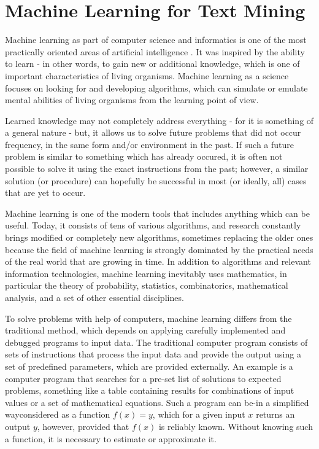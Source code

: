 \documentclass[11pt,openany,executivepaper]{book}
\begin{document}
\section{Machine Learning for Text Mining}
Machine learning \cite{199} as part of computer science and informatics is one of the most practically oriented areas of artificial intelligence \cite{161}. It was inspired by the ability to learn - in other words, to gain new or additional knowledge, which is one of important characteristics of living organisms. Machine learning as a science focuses on looking for and developing algorithms, which can simulate or emulate mental abilities of living organisms from the learning point of view.

Learned knowledge may not completely address everything - for it is something of a general nature - but, it allows us to solve future problems that did not occur frequency, in the same form and/or environment in the past. If such a future problem is similar to something which has already occured, it is often not possible to solve it using the exact instructions from the past; however, a similar solution (or procedure) can hopefully be successful in most (or ideally, all) cases that are yet to occur.

Machine learning is one of the modern tools that includes anything which can be useful. Today, it consists of tens of various algorithms, and research constantly brings modified or completely new algorithms, sometimes replacing the older ones because the field of machine learning is strongly dominated by the practical needs of the real world that are growing in time. In addition to algorithms and relevant information technologies, machine learning inevitably uses mathematics, in particular the theory of probability, statistics, combinatorics, mathematical analysis, and a set of other essential disciplines.

To solve problems with help of computers, machine learning differs from the traditional method, which depends on applying carefully implemented and debugged programs to input data. The traditional computer program consists of sets of instructions that process the input data and provide the output using a set of predefined parameters, which are provided externally. An example is a computer program that searches for a pre-set list of solutions to expected problems, something like a table containing results for combinations of input values or a set of mathematical equations. Such a program can be-in a simplified wayconsidered as a function $f(x)=y$, which for a given input $x$ returns an output $y$, however, provided that $f(x)$ is reliably known. Without knowing such a function, it is necessary to estimate or approximate it.
\end{document}
